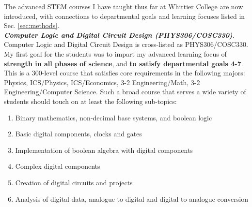 \documentclass[../../../main.tex]{subfiles}
\begin{document}
The advanced STEM courses I have taught thus far at Whittier College are now introduced, with connections to departmental goals and learning focuses listed in Sec. \ref{sec:methods}.
\\
\vspace{0.25cm}
\textbf{\textit{Computer Logic and Digital Circuit Design (PHYS306/COSC330)}}. Computer Logic and Digital Circuit Design is cross-listed as PHYS306/COSC330.  My first goal for the students was to impart my advanced learning focus of \textbf{strength in all phases of science}, and \textbf{to satisfy departmental goals 4-7}.  This is a 300-level course that satisfies core requirements in the following majors: Physics, ICS/Physics, ICS/Economics, 3-2 Engineering/Math, 3-2 Engineering/Computer Science.  Such a broad course that serves a wide variety of students should touch on at least the following sub-topics:

\begin{enumerate}
\item Binary mathematics, non-decimal base systems, and boolean logic
\item Basic digital components, clocks and gates
\item Implementation of boolean algebra with digital components
\item Complex digital components
\item Creation of digital circuits and projects
\item Analysis of digital data, analogue-to-digital and digital-to-analogue conversion
\end{enumerate}
\end{document}
